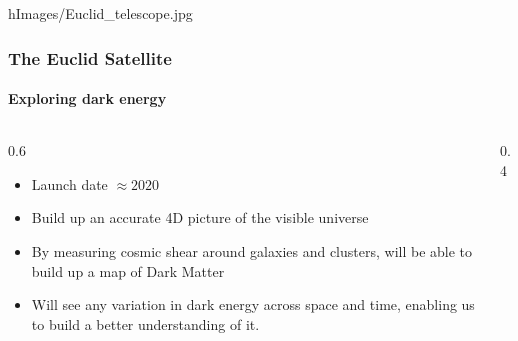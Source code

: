 \begin{frameb}{h}{Images/Euclid_telescope.jpg}
	\frametitle{The Euclid Satellite}
	\framesubtitle{Exploring dark energy}

\begin{columns}
\begin{column}{0.6\textwidth}
	\vspace{60pt}
	\begin{itemize}
		\pause\item Launch date $\approx 2020$
		\pause\item Build up an accurate 4D picture of the visible universe
		\pause\item By measuring cosmic shear around galaxies and clusters, will be able to build up a map of Dark Matter
		\pause\item Will see any variation in dark energy across space and time, enabling us to build a better understanding of it. 
	\end{itemize}
\end{column}
\begin{column}{0.4\textwidth}
\end{column}
\end{columns}
	
\end{frameb}
